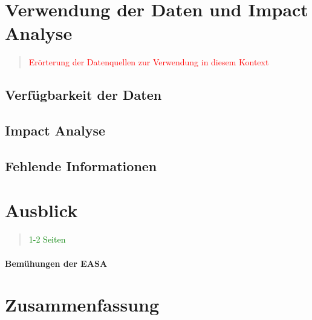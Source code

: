 \chapter{Verwendung der Daten und Impact Analyse}

\begin{quote}
\textcolor{red}{Erörterung der Datenquellen zur Verwendung in diesem Kontext}
\end{quote}

    \section{Verfügbarkeit der Daten}
    \section{Impact Analyse}
    \section{Fehlende Informationen}

\chapter{Ausblick}
\begin{quote}
\textcolor{green}{1-2 Seiten}
\end{quote}

\subsubsection{Bemühungen der EASA}

\chapter{Zusammenfassung}


